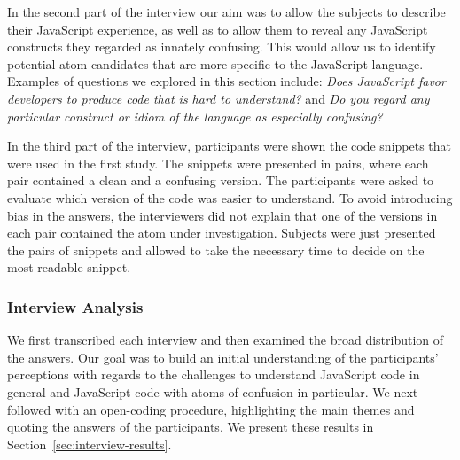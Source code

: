 In the second part of the interview our aim was to allow the subjects to describe their JavaScript experience, as well as to allow them to reveal any JavaScript constructs they regarded as innately confusing. This would allow us to identify potential atom candidates that are more specific to the JavaScript language. Examples of questions we explored in this section include: \emph{Does JavaScript favor developers to produce code that is hard to understand?} and \emph{Do you regard any particular construct or idiom of the language as
  especially confusing?}

In the third part of the interview, participants were shown the code snippets that were used in the first study. The snippets were presented in pairs, where each pair contained a clean and a confusing version. The participants 
were asked to evaluate which version of the code was easier to understand. To avoid introducing bias in the answers, the interviewers did not explain that one of the versions in each pair contained the atom under investigation. Subjects were just presented the pairs of snippets and allowed to take the necessary time to decide on the most readable snippet.

\subsubsection*{Interview Analysis}

We first transcribed each interview and then examined the broad distribution of the answers. Our goal was to build an initial understanding of the participants' perceptions with regards to the challenges to understand JavaScript code in general and JavaScript code with atoms of confusion in particular. We next followed with an open-coding procedure, highlighting the main themes and quoting the answers of the participants. We present these results in Section~\ref{sec:interview-results}. 




